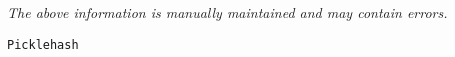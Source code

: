 \label{pkg:picklehash}

{\tiny \it The above information is manually maintained and may contain errors.}
\begin{verbatim}
Picklehash
\end{verbatim}
